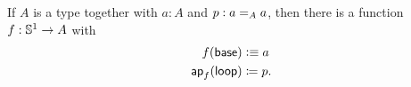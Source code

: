 \documentclass[hott-all.tex]{subfiles}
\begin{document}
% 
% 
\begin{lem}
  If $A$ is a type together with $a:A$ and $p:\id[A]aa$, then there is a
  function $f:\Sn^1\to{}A$ with
  \begin{align*}
    f(\base)&\defeq a \\
    \apfunc f(\lloop)&\defid p.
  \end{align*}
\end{lem}
\end{document}
